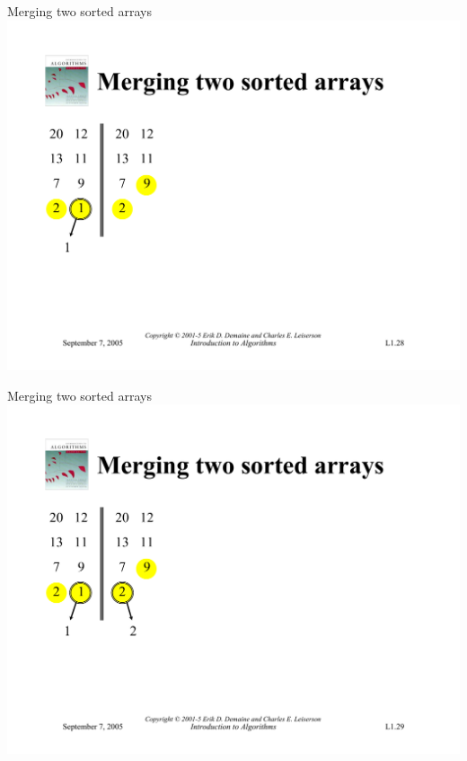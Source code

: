\documentclass{beamer}
\begin{document}
\begin{frame}{Merging two sorted arrays}
    \centering
    \includegraphics[width=\textwidth, trim={1.1cm 6cm 1.1cm 4.95cm}, clip]{pages/lec1_28}
\end{frame}
\begin{frame}{Merging two sorted arrays}
    \centering
    \includegraphics[width=\textwidth, trim={1.1cm 6cm 1.1cm 4.95cm}, clip]{pages/lec1_29}
\end{frame}
\end{document}
